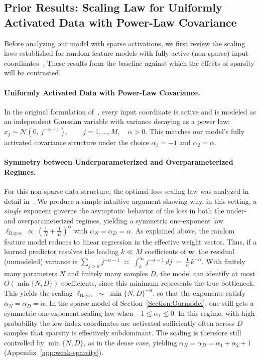 \documentclass[11pt]{article}
\theoremstyle{plain}
\theoremstyle{definition}
\theoremstyle{remark}
\newcommand{\JSCheck}[1]{#1}
\begin{document}
\subsection{Prior Results: Scaling Law for Uniformly Activated Data with Power-Law Covariance}

Before analyzing our model with sparse activations, we first review the scaling laws established for random feature models with fully active (non-sparse) input coordinates~\citep{Maloney2022SolvableScaling}. These results form the baseline against which the effects of sparsity will be contrasted.

\vspace{-2mm}

\paragraph{Uniformly Activated Data with Power-Law Covariance.}
In the original formulation of~\citet{Maloney2022SolvableScaling}, every input coordinate is active
and is modeled as an independent Gaussian variable with variance decaying as a
power law: $x_j \sim \mathcal{N}(0,\, j^{-\alpha - 1}), \qquad j = 1,\dots,M,\quad \alpha>0$. This matches our model’s fully activated covariance structure under the choice $\alpha_1=-1$ and $\alpha_2=\alpha$.

\vspace{-2mm}

\paragraph{Symmetry between Underparameterized and Overparameterized Regimes.}
For this non-sparse data structure, the optimal-loss scaling law was analyzed in detail in~\citep{Maloney2022SolvableScaling}. We produce a simple \JSCheck{intuitive} argument showing why, in this
setting, a \emph{single} exponent governs the asymptotic behavior of the loss in both the under- and overparameterized regimes, yielding a symmetric one-exponent law $\ell_{\mathrm{Bayes}} \;\propto\; \left(\frac{1}{N} + \frac{1}{D}\right)^{\alpha}$ with $\alpha_N = \alpha_D = \alpha.$  As explained above, the random feature model reduces to linear regression in the effective weight
vector. Thus, if a learned predictor resolves the leading \(k \ll M\) coefficients of \(\mathbf{w}\), the residual (unmodeled) variance is $\sum_{j>k} j^{-\alpha-1} \;\asymp\; \int_k^\infty j^{-\alpha-1}\,dj \;=\; \frac{1}{\alpha}\,k^{-\alpha}$. With finitely many parameters \(N\) and finitely many samples \(D\), the model can identify at most \(O(\min\{N,D\})\) coefficients, since this minimum represents the true bottleneck. This yields the scaling
$\ell_{\mathrm{Bayes}} \;\sim\; \min\{N,D\}^{-\alpha}$,
so that the exponents satisfy
\(\alpha_N = \alpha_D = \alpha\). In the sparse model of Section~\ref{Section:Ourmodel}, one still gets a symmetric one-exponent scaling law when $-1\le \alpha_1 \le 0$. In this regime, with high probability the low-index coordinates are activated sufficiently often across $D$ samples that sparsity is effectively subdominant. The scaling is therefore still controlled by $\min\{N,D\}$, as in the dense case, yielding $\alpha_N = 
\alpha_D = \alpha_1 + \alpha_2 + 1$ (Appendix~\ref{app:weak-sparsity}).
\end{document}
